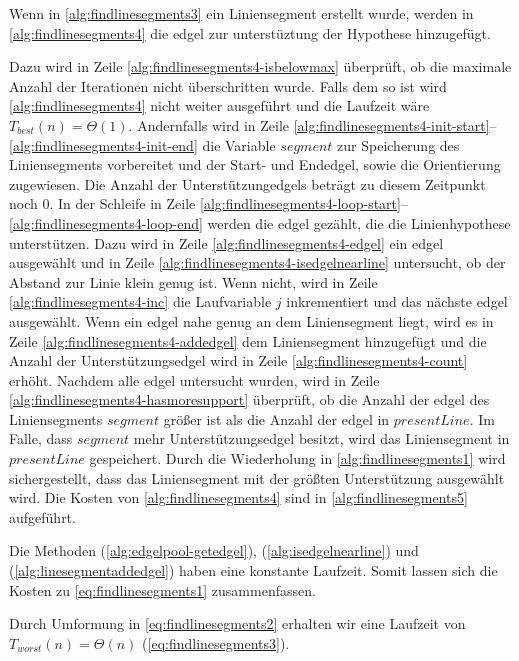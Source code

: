 Wenn in \autoref{alg:findlinesegments3} ein Liniensegment erstellt wurde, werden in \autoref{alg:findlinesegments4} die
 \gls{edgel} zur unterstüztung der Hypothese hinzugefügt.

Dazu wird in Zeile \ref{alg:findlinesegments4-isbelowmax} überprüft, ob die maximale Anzahl der Iterationen nicht
 überschritten wurde. Falls dem so ist wird \autoref{alg:findlinesegments4} nicht weiter ausgeführt und die Laufzeit
 wäre $T_{best}(n) = \Theta(1)$. Andernfalls wird in Zeile
 \ref{alg:findlinesegments4-init-start}--\ref{alg:findlinesegments4-init-end} die Variable $\mathit{segment}$ zur
 Speicherung des Liniensegments vorbereitet und der Start- und Endedgel, sowie die Orientierung zugewiesen. Die Anzahl
 der Unterstützungedgels beträgt zu diesem Zeitpunkt noch $0$. In der Schleife in Zeile
 \ref{alg:findlinesegments4-loop-start}--\ref{alg:findlinesegments4-loop-end} werden die \gls{edgel} gezählt, die die
 Linienhypothese unterstützen. Dazu wird in Zeile \ref{alg:findlinesegments4-edgel} ein \gls{edgel} ausgewählt und in
 Zeile \ref{alg:findlinesegments4-isedgelnearline} untersucht, ob der Abstand zur Linie klein genug ist. Wenn nicht,
 wird in Zeile \ref{alg:findlinesegments4-inc} die Laufvariable $j$ inkrementiert und das nächste \gls{edgel}
 ausgewählt. Wenn ein \gls{edgel} nahe genug an dem Liniensegment liegt, wird es in Zeile
 \ref{alg:findlinesegments4-addedgel} dem Liniensegment hinzugefügt und die Anzahl der Unterstützungsedgel wird in
 Zeile \ref{alg:findlinesegments4-count} erhöht. Nachdem alle \gls{edgel} untersucht wurden, wird in Zeile
 \ref{alg:findlinesegments4-hasmoresupport} überprüft, ob die Anzahl der \gls{edgel} des Liniensegments
 $\mathit{segment}$ größer ist als die Anzahl der \gls{edgel} in $\mathit{presentLine}$. Im Falle, dass
 $\mathit{segment}$ mehr Unterstützungsedgel besitzt, wird das Liniensegment in $\mathit{presentLine}$ gespeichert.
 Durch die Wiederholung in \autoref{alg:findlinesegments1} wird sichergestellt, dass das Liniensegment mit der
 größten Unterstützung ausgewählt wird. Die Kosten von \autoref{alg:findlinesegments4} sind in
 \autoref{alg:findlinesegments5} aufgeführt.

Die Methoden  (\autoref{alg:edgelpool-getedgel}), 
 (\autoref{alg:isedgelnearline}) und  (\autoref{alg:linesegmentaddedgel}) haben eine konstante
 Laufzeit. Somit lassen sich die Kosten zu \autoref{eq:findlinesegments1} zusammenfassen.

Durch Umformung in \autoref{eq:findlinesegments2} erhalten wir eine Laufzeit von $T_{worst}(n) = \Theta(n)$
 (\autoref{eq:findlinesegments3}).

